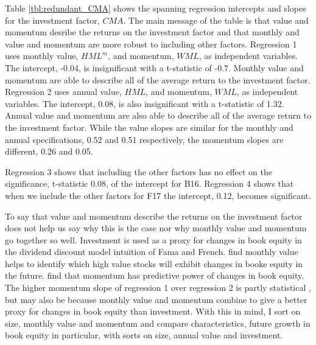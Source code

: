 
Table \ref{tbl:redundant_CMA} shows the spanning regression intercepts and slopes for the
investment factor, $CMA$. The main message of the table is that value and momentum desribe
the returns on the investment factor and that monthly and value and momentum are more
robust to including other factors. Regression 1 uses monthly value, $HML^m$, and momentum,
$WML$, as independent variables. The intercept, -0.04, is insignificant with a t-statistic
of -0.7. Monthly value and momentum are able to describe all of the average return to the
investment factor. Regression 2 uses annual value, $HML$, and momentum, $WML$, as
independent variables. The intercept, 0.08, is also insignificant with a t-statistic of
1.32. Annual value and momentum are also able to describe all of the average return to the
investment factor. While the value slopes are similar for the monthly and annual
specifications, 0.52 and 0.51 respectively, the momentum slopes are different, 0.26 and
0.05.

Regression 3 shows that including the other factors has no effect on the significance,
t-statistic 0.08, of the intercept for B16. Regression 4 shows that when we include the
other factors for F17 the intercept, 0.12, becomes significant.

To say that value and momentum describe the returns on the investment factor does not help
us say why this is the case nor why monthly value and momentum go together so well.
Investment is used as a proxy for changes in book equity in the dividend discount model
intuition of Fama and French. \textcite{kok2017facts} find monthly value helps to identify
which high value stocks will exhibit changes in booke equity in the future.
\textcite{asness2013devil} find that momentum has predictive power of changes in book
equity. The higher momentum slope of regression 1 over regression 2 is partly statistical
\parencite{fama2015incremental}, but may also be because monthly value and momentum
combine to give a better proxy for changes in book equity than investment. With this in
mind, I sort on size, monthly value and momentum and compare characteristics, future
growth in book equity in particular, with sorts on size, annual value and investment.
